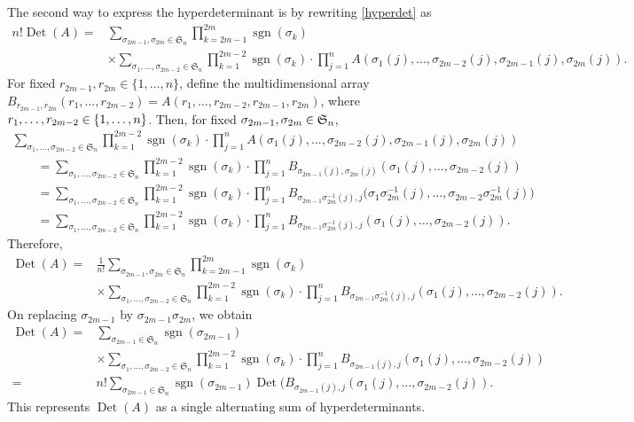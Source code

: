 \documentclass[10pt,a4paper]{amsart}
\numberwithin{equation}{section}
\def\sgn{\operatorname{sgn}}
\def\Det{\operatorname{Det}}
\def\frS{\mathfrak{S}}
\begin{document}
The second way to express the hyperdeterminant is by rewriting \eqref{hyperdet} as
\begin{align*}
n! \Det(A)={}& \sum_{\sigma_{2m-1},\sigma_{2m} \in \frS_n} \prod_{k=2m-1}^{2m} \sgn(\sigma_k) \\
& \times \sum_{\sigma_1,\dots,\sigma_{2m-2} \in \frS_n} \prod_{k=1}^{2m-2} \sgn(\sigma_k) \cdot \prod_{j=1}^n A(\sigma_1(j),\dots,\sigma_{2m-2}(j),\sigma_{2m-1}(j),\sigma_{2m}(j)).
\end{align*}
For fixed $r_{2m-1},r_{2m} \in \{1,\dots,n\}$, define the multidimensional array
$
B_{r_{2m-1},r_{2m}}(r_1,\dots,r_{2m-2}) = A(r_1,\dots,r_{2m-2},r_{2m-1},r_{2m})
$,
where $r_1,\dots,r_{2m-2} \hspace{-0.15pt}\in\hspace{-0.15pt} \{1,\dots,n\}$. Then, for fixed ${\sigma_{2m-1},\sigma_{2m}\hspace{-0.15pt} \in\hspace{-0.15pt} \frS_n}$,
\begin{gather*}
 \sum_{\sigma_1,\dots,\sigma_{2m-2} \in \frS_n} \prod_{k=1}^{2m-2} \sgn(\sigma_k) \cdot \prod_{j=1}^n A(\sigma_1(j),\dots,\sigma_{2m-2}(j),\sigma_{2m-1}(j),\sigma_{2m}(j)) \\
\qquad= \sum_{\sigma_1,\dots,\sigma_{2m-2} \in \frS_n} \prod_{k=1}^{2m-2} \sgn(\sigma_k) \cdot \prod_{j=1}^n B_{\sigma_{2m-1}(j),\sigma_{2m}(j)}(\sigma_1(j),\dots,\sigma_{2m-2}(j)) \\
\qquad= \sum_{\sigma_1,\dots,\sigma_{2m-2} \in \frS_n} \prod_{k=1}^{2m-2} \sgn(\sigma_k) \cdot \prod_{j=1}^n B_{\sigma_{2m-1}\sigma_{2m}^{-1}(j),j}\bigl(\sigma_1\sigma_{2m}^{-1}(j),\dots,\sigma_{2m-2}\sigma_{2m}^{-1}(j)\bigr) \\
\qquad= \sum_{\sigma_1,\dots,\sigma_{2m-2} \in \frS_n} \prod_{k=1}^{2m-2} \sgn(\sigma_k) \cdot \prod_{j=1}^n B_{\sigma_{2m-1}\sigma_{2m}^{-1}(j),j}(\sigma_1(j),\dots,\sigma_{2m-2}(j)).
\end{gather*}
Therefore,
\begin{align*}
\Det(A) ={} & \frac{1}{n!} \sum_{\sigma_{2m-1},\sigma_{2m} \in \frS_n} \prod_{k=2m-1}^{2m} \sgn(\sigma_k) \\
& \times \sum_{\sigma_1,\dots,\sigma_{2m-2} \in \frS_n} \prod_{k=1}^{2m-2} \sgn(\sigma_k) \cdot \prod_{j=1}^n B_{\sigma_{2m-1}\sigma_{2m}^{-1}(j),j}(\sigma_1(j),\dots,\sigma_{2m-2}(j)).
\end{align*}
On replacing $\sigma_{2m-1}$ by $\sigma_{2m-1}\sigma_{2m}$, we obtain
\begin{align}
\Det(A) ={} & \sum_{\sigma_{2m-1} \in \frS_n} \sgn(\sigma_{2m-1}) \nonumber \\
& \times \sum_{\sigma_1,\dots,\sigma_{2m-2} \in \frS_n} \prod_{k=1}^{2m-2} \sgn(\sigma_k) \cdot \prod_{j=1}^n B_{\sigma_{2m-1}(j),j}(\sigma_1(j),\dots,\sigma_{2m-2}(j)) \nonumber \\
= {}& n! \sum_{\sigma_{2m-1} \in \frS_n} \sgn(\sigma_{2m-1})
\Det(B_{\sigma_{2m-1}(j),j}(\sigma_1(j),\dots,\sigma_{2m-2}(j)).\label{recurrence_hyperdet}
\end{align}
This represents $\Det(A)$ as a single alternating sum of hyperdeterminants.
\end{document}
